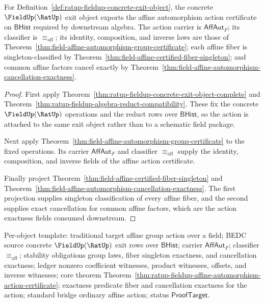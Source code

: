 \begin{theorem}
\label{thm:ratup-fieldup-affine-automorphism-action-certificate}
For Definition~\ref{def:ratup-fieldup-concrete-exit-object}, the concrete
$\FieldUp(\RatUp)$ exit object exports the affine automorphism action certificate
on $\mathsf{BHist}$ required by downstream algebra. The action carrier is
$\mathsf{AffAut}_F$; its classifier is $\equiv_{\mathrm{aff}}$; its identity,
composition, and inverse laws are those of
Theorem~\ref{thm:field-affine-automorphism-group-certificate}; each affine
fiber is singleton-classified by
Theorem~\ref{thm:field-affine-certified-fiber-singleton}; and common affine
factors cancel exactly by
Theorem~\ref{thm:field-affine-automorphism-cancellation-exactness}.
\end{theorem}
\begin{proof}
First apply Theorem~\ref{thm:ratup-fieldup-concrete-exit-object-complete} and
Theorem~\ref{thm:ratup-fieldup-algebra-reduct-compatibility}. These fix the
concrete $\FieldUp(\RatUp)$ operations and the reduct rows over
$\mathsf{BHist}$, so the action is attached to the same exit object rather than
to a schematic field package.

Next apply Theorem~\ref{thm:field-affine-automorphism-group-certificate} to
the fixed operations. Its carrier $\mathsf{AffAut}_F$ and classifier
$\equiv_{\mathrm{aff}}$ supply the identity, composition, and inverse fields of
the affine action certificate.

Finally project Theorem~\ref{thm:field-affine-certified-fiber-singleton} and
Theorem~\ref{thm:field-affine-automorphism-cancellation-exactness}. The first
projection supplies singleton classification of every affine fiber, and the
second supplies exact cancellation for common affine factors, which are the
action exactness fields consumed downstream.
\end{proof}

Per-object template: traditional target affine group action over a field; BEDC
source concrete $\FieldUp(\RatUp)$ exit rows over $\mathsf{BHist}$; carrier
$\mathsf{AffAut}_F$; classifier $\equiv_{\mathrm{aff}}$; stability obligations
group laws, fiber singleton exactness, and cancellation exactness; ledger
nonzero coefficient witnesses, product witnesses, offsets, and inverse
witnesses; core theorem
Theorem~\ref{thm:ratup-fieldup-affine-automorphism-action-certificate};
exactness predicate fiber and cancellation exactness for the action; standard
bridge ordinary affine action; status $\mathsf{ProofTarget}$.

